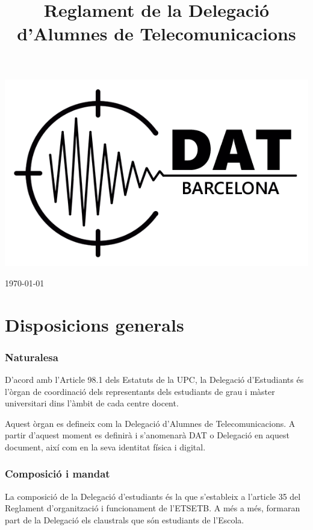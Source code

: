 \documentclass[a4paper,12pt]{article}
\title{Reglament de la Delegació d'Alumnes de Telecomunicacions}
\begin{document}
\thispagestyle{empty}
\begin{center}
\includegraphics{Dat_logo_10x6.png}
\vspace{3em}

\Huge
\@title
\vspace{1em}

\large
\today
\end{center}
\normalsize
\newpage

\thispagestyle{empty}
\tableofcontents
\newpage

\section{Disposicions generals}
\subsubsection{Naturalesa}
D’acord amb l’Article 98.1 dels Estatuts de la UPC, la Delegació d’Estudiants és l’òrgan de coordinació dels representants dels estudiants de grau i màster universitari dins l’àmbit de cada centre docent.

Aquest òrgan es defineix com la Delegació d’Alumnes de Telecomunicacions. A partir d’aquest moment es definirà i s’anomenarà DAT o Delegació en aquest document, així com en la seva identitat física i digital.

\subsubsection{Composició i mandat}
La composició de la Delegació d’estudiants és la que s’estableix a l'article 35 del Reglament d’organització i funcionament de l’ETSETB. A més a més, formaran part de la Delegació els claustrals que són estudiants de l’Escola.
\end{document}
